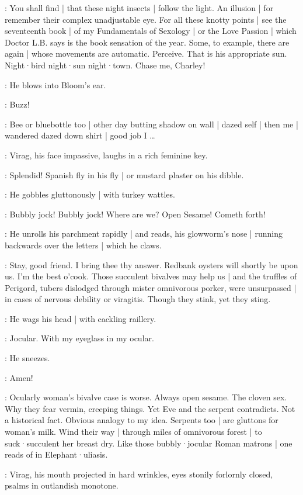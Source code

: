 \Virag:
You shall find |
that these night insects |
follow the light.
An illusion |
for remember their complex unadjustable eye.
For all these knotty points |
see the seventeenth book |
of my Fundamentals of Sexology |
or the Love Passion |
which Doctor L.B.
says is the book sensation of the year.
Some,
to example,
there are again |
whose movements are automatic.
Perceive.
That is his appropriate sun.
Night·bird night·sun night·town.
Chase me,
Charley!

:
He blows into Bloom's ear.

\Virag:
Buzz!

\Bloom:
Bee or bluebottle too |
other day butting shadow on wall |
dazed self |
then me |
wandered dazed down shirt |
good job I \ldots%

:
Virag,
his face impassive,
laughs in a rich feminine key.

\Virag:
Splendid!
Spanish fly in his fly |
or mustard plaster on his dibble.

:
He gobbles gluttonously |
with turkey wattles.

\Virag:
Bubbly jock!
Bubbly jock!
Where are we?
Open Sesame!
Cometh forth!

:
He unrolls his parchment rapidly |
and reads,
his glowworm's nose |
running backwards over the letters |
which he claws.

\Virag:
Stay,
good friend.
I bring thee thy answer.
Redbank oysters will shortly be upon us.
I'm the best o'cook.
Those succulent bivalves may help us |
and the truffles of Perigord,
tubers dislodged through mister omnivorous porker,
were unsurpassed |
in cases of nervous debility or viragitis.
Though they stink,
yet they sting.

:
He wags his head |
with cackling raillery.

\Virag:
Jocular.
With my eyeglass in my ocular.

:
He sneezes.

\Virag:
Amen!

\Bloom:
Ocularly woman's bivalve case is worse.
Always open sesame.
The cloven sex.
Why they fear vermin,
creeping things.
Yet Eve and the serpent contradicts.
Not a historical fact.
Obvious analogy to my idea.
Serpents too |
are gluttons for woman's milk.
Wind their way |
through miles of omnivorous forest |
to suck·succulent her breast dry.
Like those bubbly·jocular Roman matrons |
one reads of in Elephant·uliasis.

:
Virag,
his mouth projected in hard wrinkles,
eyes stonily forlornly closed,
psalms in outlandish monotone.


